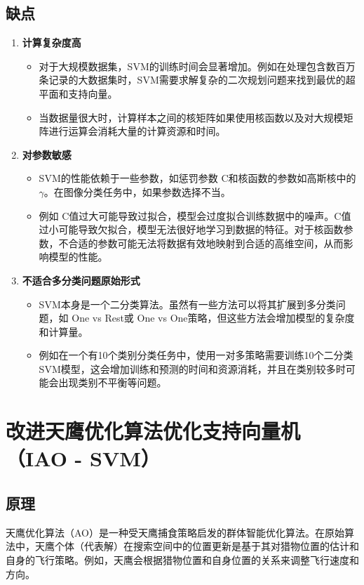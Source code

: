 \documentclass[12pt]{article}
\begin{document}
\subsection{缺点}
\begin{enumerate}
    \item \textbf{计算复杂度高}
    \begin{itemize}
        \item 对于大规模数据集，SVM的训练时间会显著增加。例如在处理包含数百万条记录的大数据集时，SVM需要求解复杂的二次规划问题来找到最优的超平面和支持向量。
        \item 当数据量很大时，计算样本之间的核矩阵如果使用核函数以及对大规模矩阵进行运算会消耗大量的计算资源和时间。
    \end{itemize}
    \item \textbf{对参数敏感}
    \begin{itemize}
        \item SVM的性能依赖于一些参数，如惩罚参数 C和核函数的参数如高斯核中的 \(\gamma\)。在图像分类任务中，如果参数选择不当。
        \item 例如 C值过大可能导致过拟合，模型会过度拟合训练数据中的噪声。C值过小可能导致欠拟合，模型无法很好地学习到数据的特征。对于核函数参数，不合适的参数可能无法将数据有效地映射到合适的高维空间，从而影响模型的性能。
    \end{itemize}
    \item \textbf{不适合多分类问题原始形式}
    \begin{itemize}
        \item SVM本身是一个二分类算法。虽然有一些方法可以将其扩展到多分类问题，如 One vs Rest或 One vs One策略，但这些方法会增加模型的复杂度和计算量。
        \item 例如在一个有10个类别分类任务中，使用一对多策略需要训练10个二分类SVM模型，这会增加训练和预测的时间和资源消耗，并且在类别较多时可能会出现类别不平衡等问题。
    \end{itemize}
\end{enumerate}

\section{改进天鹰优化算法优化支持向量机（IAO - SVM）}
\subsection{原理}
天鹰优化算法（AO）是一种受天鹰捕食策略启发的群体智能优化算法。在原始算法中，天鹰个体（代表解）在搜索空间中的位置更新是基于其对猎物位置的估计和自身的飞行策略。例如，天鹰会根据猎物位置和自身位置的关系来调整飞行速度和方向。
\end{document}
